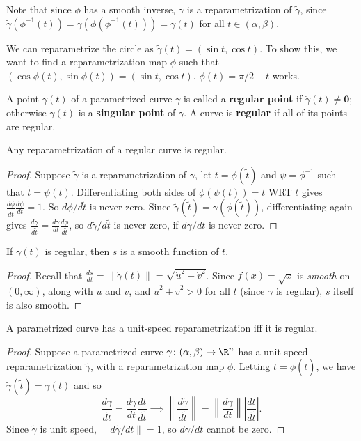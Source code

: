 Note that since $\phi$ has a smooth inverse, $\gamma $ is a reparametrization of $\widetilde {\gamma}$, since $\widetilde {\gamma}(\phi ^{-1}(t))=\gamma(\phi (\phi ^{-1}(t)))=\gamma(t)$ for all $t \in (\alpha ,\beta )$.
\begin{example}
    We can reparametrize the circle as $\widetilde {\gamma}(t)=(\sin t, \cos t)$. To show this, we want to find a reparametrization map $\phi$ such that $(\cos \phi(t),\sin \phi(t))=(\sin t, \cos t)$. $\phi(t)=\pi /2 -t$ works.
\end{example}
\begin{definition}[]
    A point $\gamma(t)$ of a parametrized curve $\gamma$ is called a \textbf{regular point} if $\dot\gamma(t)\neq \mathbf 0$; otherwise $\gamma(t)$ is a \textbf{singular point} of $\gamma$. A curve is \textbf{regular} if all of its points are regular.
\end{definition}
\begin{prop}
    Any reparametrization of a regular curve is regular.
\end{prop}
\begin{proof}
    Suppose $\widetilde {\gamma}$ is a reparametrization of $\gamma$, let $t=\phi(\widetilde t)$ and $\psi = \phi ^{-1}$ such that $\widetilde t=\psi (t)$. Differentiating both sides of $\phi(\psi(t))=t$ WRT $t$ gives $\frac{d \phi}{d \widetilde t}\frac{d\psi}{dt}=1$. So $d \phi / d \widetilde t$ is never zero. Since $\widetilde {\gamma}(\widetilde t)=\gamma(\phi(\widetilde t))$, differentiating again gives $\frac{d\widetilde {\gamma}}{d\widetilde t}=\frac{d\gamma}{dt}\frac{d\phi}{d \widetilde t}$, so $d \widetilde {\gamma} / d \widetilde t$ is never zero, if $d \gamma / dt$ is never zero.
\end{proof}
\begin{prop}
    If $\gamma(t)$ is regular, then $s$ is a smooth function of $t$.
\end{prop}
\begin{proof}
    Recall that $\frac{ds}{dt}=\|\dot\gamma(t)\|=\sqrt{\dot u ^2+ \dot v^2} $. Since $f(x)=\sqrt{x} $ is \emph{smooth} on $(0,\infty)$, along with $u$ and $v$, and $\dot u ^2+\dot v^2>0$ for all $t$ (since $\gamma$ is regular), $s$ itself is also smooth.
\end{proof}
\begin{prop}
    A parametrized curve has a unit-speed reparametrization iff it is regular.
\end{prop}
\begin{proof}
    Suppose a parametrized curve $\gamma \colon (\alpha ,\beta ) \to \R^n $ has a unit-speed reparametrization $\widetilde {\gamma}$, with a reparametrization map $\phi$. Letting $t=\phi(\widetilde t)$, we have $\widetilde {\gamma }(\widetilde t)=\gamma(t)$ and so \[
        \frac{d\widetilde {\gamma}}{d\widetilde t}= \frac{d\gamma}{dt}\frac{dt}{d\widetilde t} \implies  \left\| \frac{d \widetilde {\gamma}}{d\widetilde t}\right\| = \left\| \frac{d\gamma}{dt}\right\| \left| \frac{dt}{d\widetilde t} \right| .
    \] Since $\widetilde \gamma $ is unit speed, $\| d \widetilde \gamma/ d\widetilde t\|=1$, so $d\gamma / dt$ cannot be zero.
\end{proof}
